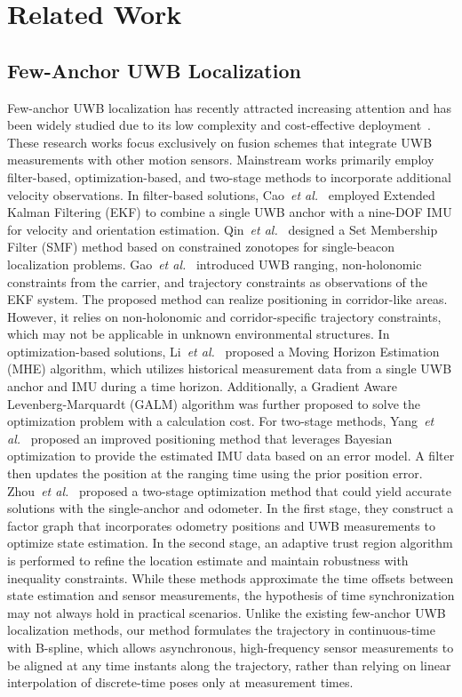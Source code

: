 \section{Related Work}
\subsection{Few-Anchor UWB Localization}
Few-anchor UWB localization has recently attracted increasing attention and has been widely studied due to its low complexity and cost-effective deployment~\cite{tong2022single,9829196,penggang2022novel}. 
These research works focus exclusively
on fusion schemes that integrate UWB measurements with other motion sensors. Mainstream works primarily employ filter-based, optimization-based, and two-stage methods to incorporate additional velocity observations. 
In filter-based solutions, Cao~\textit{et al.}~\cite{cao2020accurate} employed Extended Kalman Filtering (EKF) to combine a single UWB anchor with a nine-DOF IMU for velocity and orientation estimation. Qin~\textit{et al.}~\cite{qin2024single} designed a Set Membership Filter (SMF) method based on constrained zonotopes for single-beacon localization problems. 
Gao~\textit{et al.}~\cite{penggang2022novel} introduced UWB ranging, non-holonomic constraints from the carrier, and trajectory constraints as observations of the EKF system. The proposed method can realize positioning in corridor-like areas. However, it relies on non-holonomic and corridor-specific trajectory constraints, which may not be applicable in unknown environmental structures. 
In optimization-based solutions, Li~\textit{et al.}~\cite{li2021computationally} proposed a Moving Horizon Estimation (MHE) algorithm, which utilizes historical measurement data from a single UWB anchor and IMU during a time horizon. Additionally, a Gradient Aware Levenberg-Marquardt (GALM) algorithm was further proposed to solve the optimization problem with a calculation cost. 
For two-stage methods, Yang~\textit{et al.}~\cite{yang2023novel} proposed an improved positioning method that leverages Bayesian optimization to provide the estimated IMU data based on an error model. A filter then updates the position at the ranging time using the prior position error. 
Zhou~\textit{et al.}~\cite{zhou2024optimization} proposed a two-stage optimization method that could yield accurate solutions with the single-anchor and odometer.
In the first stage, they construct a factor graph that incorporates odometry positions and UWB measurements to optimize state estimation. In the second stage, an adaptive trust region algorithm is performed to refine the location estimate and maintain robustness with inequality constraints.  While these methods approximate the time offsets between state estimation and sensor measurements, the hypothesis of time synchronization may not always hold in practical scenarios. Unlike the existing few-anchor UWB localization methods, our method
formulates the trajectory in continuous-time with B-spline, which allows asynchronous, high-frequency sensor measurements to be aligned at any time instants along the trajectory, rather than relying on linear interpolation of discrete-time poses only at measurement times.

